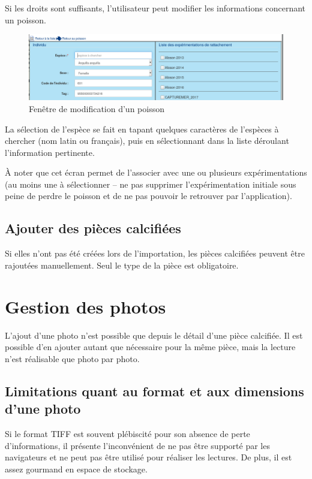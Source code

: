 Si les droits sont suffisants, l'utilisateur peut modifier les informations concernant un poisson. 

\begin{figure}[H]
\centering
\includegraphics[width=\linewidth]{images/poissonModif}
\caption{Fenêtre de modification d'un poisson}
\end{figure}

La sélection de l'espèce se fait en tapant quelques caractères de l'espèces à chercher (nom latin ou français), puis en sélectionnant dans la liste déroulant l'information pertinente.

À noter que cet écran permet de l'associer avec une ou plusieurs expérimentations (au moins une à sélectionner -- ne pas supprimer l'expérimentation initiale sous peine de \og perdre \fg{} le poisson et de ne pas pouvoir le retrouver par l'application).

\subsection{Ajouter des pièces calcifiées}

Si elles n'ont pas été créées lors de l'importation, les pièces calcifiées peuvent être rajoutées manuellement. Seul le type de la pièce est obligatoire.

\section{Gestion des photos}

L'ajout d'une photo n'est possible que depuis le détail d'une pièce calcifiée. Il est possible d'en ajouter autant que nécessaire pour la même pièce, mais la lecture n'est réalisable que photo par photo.

\subsection{Limitations quant au format et aux dimensions d'une photo}

Si le format TIFF est souvent plébiscité pour son absence de perte d'informations, il présente l'inconvénient de ne pas être supporté par les navigateurs et ne peut pas être utilisé pour réaliser les lectures. De plus, il est assez gourmand en espace de stockage.

